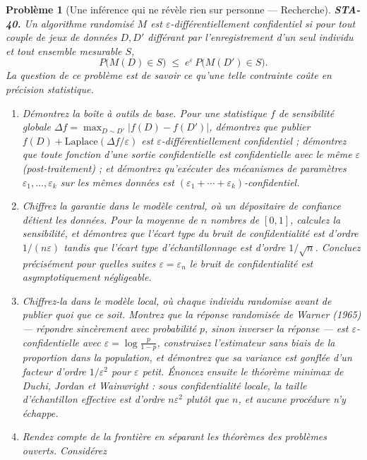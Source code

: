 \documentclass[11pt]{article}
\newtheorem{problem}{Problème}
\begin{document}
\begin{problem}[{Une inférence qui ne révèle rien sur personne --- Recherche}]
\textbf{STA-40.} Un algorithme randomisé $ M $ est $ \varepsilon $-\textit{différentiellement
confidentiel} si pour tout couple de jeux de données $ D, D' $ différant par l'enregistrement
d'un seul individu et tout ensemble mesurable $ S $,
\[ P\big( M(D) \in S \big) \;\le\; e^{\varepsilon}\, P\big( M(D') \in S \big) . \]
La question de ce problème est de savoir ce qu'une telle contrainte coûte en précision
statistique.
\begin{enumerate}
\item[(a)] Démontrez la boîte à outils de base. Pour une statistique $ f $ de sensibilité globale
$ \Delta f = \max_{D \sim D'} | f(D) - f(D') | $, démontrez que publier
$ f(D) + \mathrm{Laplace}(\Delta f / \varepsilon) $ est
$ \varepsilon $-différentiellement confidentiel ; démontrez que toute fonction d'une sortie
confidentielle est confidentielle avec le même $ \varepsilon $ (post-traitement) ; et démontrez
qu'exécuter des mécanismes de paramètres $ \varepsilon_1, \dots, \varepsilon_k $ sur les mêmes
données est $ (\varepsilon_1 + \cdots + \varepsilon_k) $-confidentiel.
\item[(b)] Chiffrez la garantie dans le modèle central, où un dépositaire de confiance détient les
données. Pour la moyenne de $ n $ nombres de $ [0,1] $, calculez la sensibilité, et démontrez
que l'écart type du bruit de confidentialité est d'ordre $ 1/(n\varepsilon) $ tandis que l'écart
type d'échantillonnage est d'ordre $ 1/\sqrt{n} $. Concluez précisément pour quelles suites
$ \varepsilon = \varepsilon_n $ le bruit de confidentialité est asymptotiquement
négligeable.
\item[(c)] Chiffrez-la dans le modèle local, où chaque individu randomise avant de publier quoi que ce
soit. Montrez que la réponse randomisée de Warner (1965) --- répondre sincèrement avec probabilité
$ p $, sinon inverser la réponse --- est $ \varepsilon $-confidentielle avec
$ \varepsilon = \log\frac{p}{1-p} $, construisez l'estimateur sans biais de la proportion dans la
population, et démontrez que sa variance est gonflée d'un facteur d'ordre $ 1/\varepsilon^2 $
pour $ \varepsilon $ petit. Énoncez ensuite le théorème minimax de Duchi, Jordan et Wainwright :
sous confidentialité locale, la taille d'échantillon effective est d'ordre $ n\varepsilon^2 $
plutôt que $ n $, et aucune procédure n'y échappe.
\item[(d)] Rendez compte de la frontière en séparant les théorèmes des problèmes ouverts. Considérez

\end{enumerate}
\end{problem}
\end{document}
